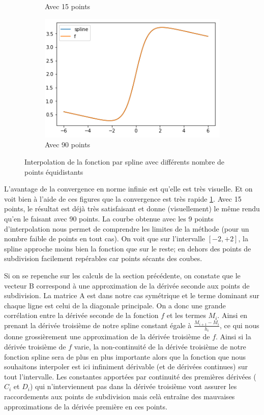 \begin{figure}[h]
\begin{subfigure}[b]{0.4\linewidth}
    \caption{Avec 15 points}
  \end{subfigure}
  \begin{subfigure}[b]{0.4\linewidth}
    \includegraphics[width=\linewidth]{fig8}
    \caption{Avec 90 points}
  \end{subfigure}
  \caption{Interpolation de la fonction par spline avec différents nombre de points équidistants}
  \label{fig:6:fspl}
\end{figure}

L'avantage de la convergence en norme infinie est qu'elle est très visuelle. Et on voit bien à l'aide de ces figures que la convergence est très rapide \ref{fig:6:fspl}.
Avec 15 points, le résultat est déjà très satisfaisant et donne (visuellement) le même rendu qu'en le faisant avec 90 points.
La courbe obtenue avec les 9 points d'interpolation nous permet de comprendre les limites de la méthode (pour un nombre faible de points en tout cas).
On voit que sur l'intervalle $[-2,+2]$, la spline approche moins bien la fonction que sur le reste; en dehors des points de subdivision facilement repérables car
points sécants des coubes.

Si on se repenche sur les calculs de la section précédente, on constate que le vecteur B correspond à une approximation de la dérivée seconde aux
points de subdivision. La matrice A est dans notre cas symétrique et le terme dominant sur chaque ligne est celui de la diagonale principale. On a donc
une grande corrélation entre la dérivée seconde de la fonction $f$ et les termes $M_i$. Ainsi en prenant la dérivée troisième de notre spline constant égale à
$\frac{M_{i+1} - M_i}{h_i}$, ce qui nous donne grossièrement une approximation de la dérivée troisième de $f$. Ainsi si la dérivée troisième de $f$ varie,
la non-continuité de la dérivée troisième de notre fonction spline sera de plus en plus importante alors que la fonction que nous souhaitons interpoler est ici
infiniment dérivable (et de dérivées continues) sur tout l'intervalle. Les constantes apportées par continuité des premières dérivées ($C_i$ et $D_i$) qui
n'interviennent pas dans la dérivée troisième vont assurer les raccordements aux points de subdivision mais celà entraîne des mauvaises approximations
de la dérivée première en ces points.

